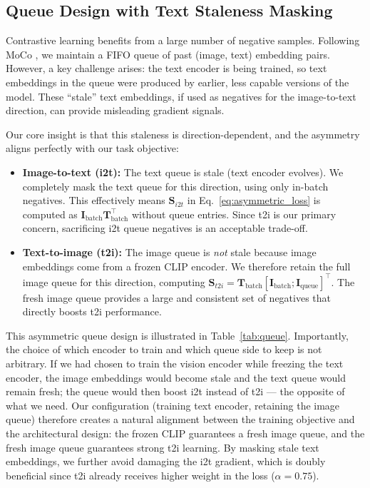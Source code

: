 \documentclass[10pt,leqno]{amsart}
\begin{document}
\subsection{Queue Design with Text Staleness Masking}

Contrastive learning benefits from a large number of negative samples. Following MoCo \citep{he2020moco}, we maintain a FIFO queue of past (image, text) embedding pairs. However, a key challenge arises: the text encoder is being trained, so text embeddings in the queue were produced by earlier, less capable versions of the model. These ``stale'' text embeddings, if used as negatives for the image-to-text direction, can provide misleading gradient signals.

Our core insight is that this staleness is direction-dependent, and the asymmetry aligns perfectly with our task objective:

\begin{itemize}
    \item \textbf{Image-to-text (i2t):} The text queue is stale (text encoder evolves). We completely mask the text queue for this direction, using only in-batch negatives. This effectively means $\mathbf{S}_{i2t}$ in Eq.~\ref{eq:asymmetric_loss} is computed as $\mathbf{I}_{\text{batch}} \mathbf{T}_{\text{batch}}^{\top}$ without queue entries. Since t2i is our primary concern, sacrificing i2t queue negatives is an acceptable trade-off.
    \item \textbf{Text-to-image (t2i):} The image queue is \emph{not} stale because image embeddings come from a frozen CLIP encoder. We therefore retain the full image queue for this direction, computing $\mathbf{S}_{t2i} = \mathbf{T}_{\text{batch}} [\mathbf{I}_{\text{batch}}; \mathbf{I}_{\text{queue}}]^{\top}$. The fresh image queue provides a large and consistent set of negatives that directly boosts t2i performance.
\end{itemize}

This asymmetric queue design is illustrated in Table~\ref{tab:queue}. Importantly, the choice of which encoder to train and which queue side to keep is not arbitrary. If we had chosen to train the vision encoder while freezing the text encoder, the image embeddings would become stale and the text queue would remain fresh; the queue would then boost i2t instead of t2i --- the opposite of what we need. Our configuration (training text encoder, retaining the image queue) therefore creates a natural alignment between the training objective and the architectural design: the frozen CLIP guarantees a fresh image queue, and the fresh image queue guarantees strong t2i learning. By masking stale text embeddings, we further avoid damaging the i2t gradient, which is doubly beneficial since t2i already receives higher weight in the loss ($\alpha = 0.75$).
\end{document}
